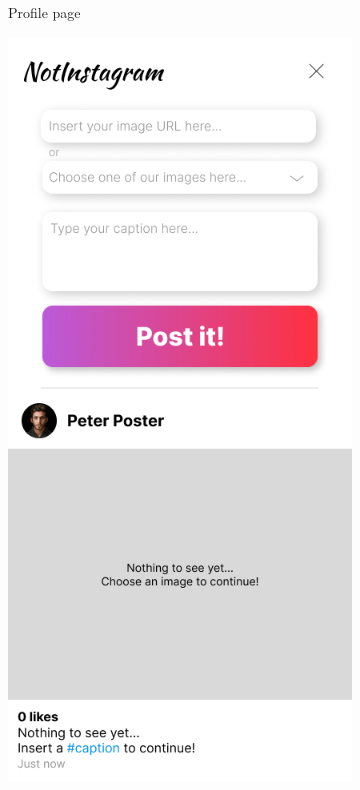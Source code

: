 \documentclass[a4paper, 12pt]{article}
\begin{document}
\begin{figure}[h]
\begin{subfigure}{0.24\linewidth}
\begin{center}
    \end{center}
    \caption{Profile page}\label{subfig:user}
  \end{subfigure}
  \begin{subfigure}{0.24\linewidth}
    \begin{center}
      \includegraphics[width=\linewidth, height=0.3\textheight, keepaspectratio,frame]{img/ig-clone/Beitrag erstellen.png}

\end{center}
\end{subfigure}
\end{figure}
\end{document}
